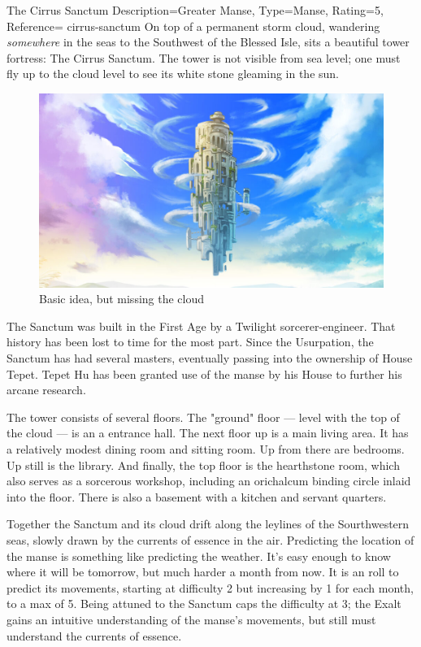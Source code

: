 \begin{Merit}{The Cirrus Sanctum}{%
    Description=Greater Manse,
    Type=Manse,
    Rating=5,
    Reference=\cite*[p.~163]{ex3}
}{cirrus-sanctum}
    On top of a permanent storm cloud, wandering \emph{somewhere} in the seas
    to the Southwest of the Blessed Isle, sits a beautiful tower fortress: The
    Cirrus Sanctum. The tower is not visible from sea level; one must fly up
    to the cloud level to see its white stone gleaming in the sun.

    \begin{figure}[h]
        \includegraphics[width=\linewidth]{CirrusSanctum.jpg}
        \caption*{Basic idea, but missing the cloud}
    \end{figure}

    The Sanctum was built in the First Age by a Twilight sorcerer-engineer.
    That history has been lost to time for the most part. Since the Usurpation,
    the Sanctum has had several masters, eventually passing into the ownership
    of House Tepet. Tepet Hu has been granted use of the manse by his House to
    further his arcane research.

    The tower consists of several floors. The "ground" floor --- level with the
    top of the cloud --- is an a entrance hall. The next floor up is a main
    living area. It has a relatively modest dining room and sitting room. Up
    from there are bedrooms. Up still is the library. And finally, the top
    floor is the hearthstone room, which also serves as a sorcerous workshop,
    including an orichalcum binding circle inlaid into the floor. There is also
    a basement with a kitchen and servant quarters.

    Together the Sanctum and its cloud drift along the leylines of the
    Sourthwestern seas, slowly drawn by the currents of essence in the air.
    Predicting the location of the manse is something like predicting the
    weather. It's easy enough to know where it will be tomorrow, but much
    harder a month from now. It is an  roll to predict its movements, starting at difficulty 2
    but increasing by 1 for each month, to a max of 5. Being attuned to the
    Sanctum caps the difficulty at 3; the Exalt gains an intuitive
    understanding of the manse's movements, but still must understand the
    currents of essence.



\end{Merit}
